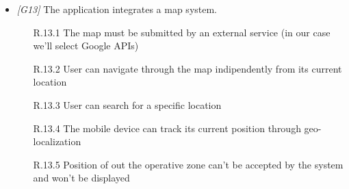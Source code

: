 \begin{itemize}
\item \textit{[G13]} The application integrates a map system.
                   
                  \begin{itemize}
                        \item [R.13.1] The map must be submitted by an external service (in our case we'll select Google APIs)
                        \item [R.13.2] User can navigate through the map indipendently from its current location
                        \item [R.13.3] User can search for a specific location
                        \item [R.13.4] The mobile device can track its current position through geo-localization
                        \item [R.13.5] Position of out the operative zone can't be accepted by the system and won't be displayed
                   \end{itemize}


            \end{itemize}
            
\vfill